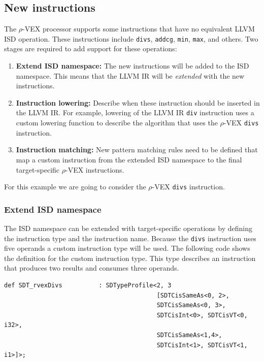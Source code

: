 \subsection{New instructions}
The $\rho$-VEX processor supports some instructions that have no equivalent LLVM ISD operation. These instructions include \texttt{divs}, \texttt{addcg}, \texttt{min}, \texttt{max}, and others. Two stages are required to add support for these operations:

\begin{enumerate}
  \item \textbf{Extend ISD namespace:} The new instructions will be added to the ISD namespace. This means that the LLVM IR will be \emph{extended} with the new instructions.
  \item \textbf{Instruction lowering:} Describe when these instruction should be inserted in the LLVM IR. For example, lowering of the LLVM IR \texttt{div} instruction uses a custom lowering function to describe the algorithm that uses the $\rho$-VEX \texttt{divs} instruction.
  \item \textbf{Instruction matching:} New pattern matching rules need to be defined that map a custom instruction from the extended ISD namespace to the final target-specific $\rho$-VEX instructions.
\end{enumerate}

For this example we are going to consider the $\rho$-VEX \texttt{divs} instruction.

\subsubsection{Extend ISD namespace}
The ISD namespace can be extended with target-specific operations by defining the instruction type and the instruction name. Because the \texttt{divs} instruction uses five operands a custom instruction type will be used. The following code shows the definition for the custom instruction type. This type describes an instruction that produces two results and consumes three operands.

\begin{lstlisting}[language=tblgen]
def SDT_rvexDivs          : SDTypeProfile<2, 3
                                          [SDTCisSameAs<0, 2>,
                                          SDTCisSameAs<0, 3>,
                                          SDTCisInt<0>, SDTCisVT<0, i32>,
                                          SDTCisSameAs<1,4>,
                                          SDTCisInt<1>, SDTCisVT<1, i1>]>;
\end{lstlisting}

